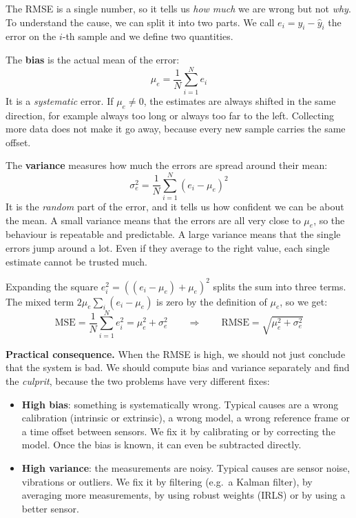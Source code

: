 \begin{infobox}
The RMSE is a single number, so it tells us \emph{how much} we are wrong but not \emph{why}. To understand the cause, we can split it into two parts. We call $e_i = y_i - \hat{y}_i$ the error on the $i$-th sample and we define two quantities.

The \textbf{bias} is the actual mean of the error:
\[
\mu_e = \frac{1}{N}\sum_{i=1}^{N} e_i
\]
It is a \emph{systematic} error. If $\mu_e \neq 0$, the estimates are always shifted in the same direction, for example always too long or always too far to the left. Collecting more data does not make it go away, because every new sample carries the same offset.

The \textbf{variance} measures how much the errors are spread around their mean:
\[
\sigma_e^2 = \frac{1}{N}\sum_{i=1}^{N} \left(e_i - \mu_e\right)^2
\]
It is the \emph{random} part of the error, and it tells us how confident we can be about the mean. A small variance means that the errors are all very close to $\mu_e$, so the behaviour is repeatable and predictable. A large variance means that the single errors jump around a lot. Even if they average to the right value, each single estimate cannot be trusted much.

Expanding the square $e_i^2 = \left((e_i - \mu_e) + \mu_e\right)^2$ splits the sum into three terms. The mixed term $2\mu_e\sum_i (e_i-\mu_e)$ is zero by the definition of $\mu_e$, so we get:
\[
\mathrm{MSE} = \frac{1}{N}\sum_{i=1}^{N} e_i^2 = \mu_e^2 + \sigma_e^2
\qquad\Longrightarrow\qquad
\boxed{\mathrm{RMSE} = \sqrt{\mu_e^2 + \sigma_e^2}}
\]

\textbf{Practical consequence.} When the RMSE is high, we should not just conclude that the system is bad. We should compute bias and variance separately and find the \emph{culprit}, because the two problems have very different fixes:
\begin{itemize}
    \item \textbf{High bias}: something is systematically wrong. Typical causes are a wrong calibration (intrinsic or extrinsic), a wrong model, a wrong reference frame or a time offset between sensors. We fix it by calibrating or by correcting the model. Once the bias is known, it can even be subtracted directly.
    \item \textbf{High variance}: the measurements are noisy. Typical causes are sensor noise, vibrations or outliers. We fix it by filtering (e.g.\ a Kalman filter), by averaging more measurements, by using robust weights (IRLS) or by using a better sensor.
\end{itemize}
\end{infobox}

